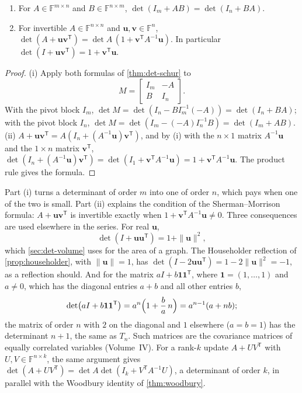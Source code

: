 \begin{theorem}
\label{thm:det-lemma}
\leavevmode
\begin{enumerate}
\item For $A\in\mathbb F^{m\times n}$ and $B\in\mathbb F^{n\times m}$, $\det(I_m+AB)=\det(I_n+BA)$.
\item For invertible $A\in\mathbb F^{n\times n}$ and $\mathbf u,\mathbf v\in\mathbb F^n$, $\det(A+\mathbf u\mathbf v^{\mathsf T})=\det A\,(1+\mathbf v^{\mathsf T}A^{-1}\mathbf u)$. In particular $\det(I+\mathbf u\mathbf v^{\mathsf T})=1+\mathbf v^{\mathsf T}\mathbf u$.
\end{enumerate}
\end{theorem}

\begin{proof}
(i) Apply both formulas of \cref{thm:det-schur} to
\[
M=\begin{bmatrix}I_m&-A\\B&I_n\end{bmatrix}.
\]
With the pivot block $I_m$, $\det M=\det(I_n-BI_m^{-1}(-A))=\det(I_n+BA)$; with the pivot block $I_n$, $\det M=\det(I_m-(-A)I_n^{-1}B)=\det(I_m+AB)$. (ii) $A+\mathbf u\mathbf v^{\mathsf T}=A(I_n+(A^{-1}\mathbf u)\mathbf v^{\mathsf T})$, and by (i) with the $n\times1$ matrix $A^{-1}\mathbf u$ and the $1\times n$ matrix $\mathbf v^{\mathsf T}$, $\det(I_n+(A^{-1}\mathbf u)\mathbf v^{\mathsf T})=\det(I_1+\mathbf v^{\mathsf T}A^{-1}\mathbf u)=1+\mathbf v^{\mathsf T}A^{-1}\mathbf u$. The product rule gives the formula.
\end{proof}

Part (i) turns a determinant of order $m$ into one of order $n$, which pays when one of the two is small. Part (ii) explains the condition of the Sherman--Morrison formula: $A+\mathbf u\mathbf v^{\mathsf T}$ is invertible exactly when $1+\mathbf v^{\mathsf T}A^{-1}\mathbf u\ne0$. Three consequences are used elsewhere in the series. For real $\mathbf u$,
\[
\det(I+\mathbf u\mathbf u^{\mathsf T})=1+\|\mathbf u\|^2,
\]
which \cref{sec:det-volume} uses for the area of a graph. The Householder reflection of \cref{prop:householder}, with $\|\mathbf u\|=1$, has $\det(I-2\mathbf u\mathbf u^{\mathsf T})=1-2\|\mathbf u\|^2=-1$, as a reflection should. And for the matrix $aI+b\mathbf 1\mathbf 1^{\mathsf T}$, where $\mathbf 1=(1,\ldots,1)$ and $a\ne0$, which has the diagonal entries $a+b$ and all other entries $b$,
\[
\det\bigl(aI+b\mathbf 1\mathbf 1^{\mathsf T}\bigr)=a^n\Bigl(1+\frac{b}{a}\,n\Bigr)=a^{n-1}(a+nb);
\]
the matrix of order $n$ with $2$ on the diagonal and $1$ elsewhere ($a=b=1$) has the determinant $n+1$, the same as $T_n$. Such matrices are the covariance matrices of equally correlated variables (Volume~IV). For a rank-$k$ update $A+UV^{\mathsf T}$ with $U,V\in\mathbb F^{n\times k}$, the same argument gives $\det(A+UV^{\mathsf T})=\det A\det(I_k+V^{\mathsf T}A^{-1}U)$, a determinant of order $k$, in parallel with the Woodbury identity of \cref{thm:woodbury}.

